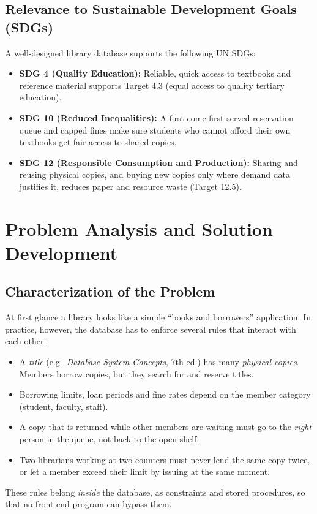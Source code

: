 \documentclass[11pt,a4paper]{report}
\begin{document}
\subsection{Relevance to Sustainable Development Goals (SDGs)}
A well-designed library database supports the following UN SDGs:
\begin{itemize}
    \item \textbf{SDG 4 (Quality Education):} Reliable, quick access to textbooks and reference material supports Target 4.3 (equal access to quality tertiary education).
    \item \textbf{SDG 10 (Reduced Inequalities):} A first-come-first-served reservation queue and capped fines make sure students who cannot afford their own textbooks get fair access to shared copies.
    \item \textbf{SDG 12 (Responsible Consumption and Production):} Sharing and reusing physical copies, and buying new copies only where demand data justifies it, reduces paper and resource waste (Target 12.5).
\end{itemize}


\section{Problem Analysis and Solution Development}

\subsection{Characterization of the Problem}
At first glance a library looks like a simple ``books and borrowers'' application. In practice, however, the database has to enforce several rules that interact with each other:
\begin{itemize}
    \item A \emph{title} (e.g.\ \textit{Database System Concepts}, 7th ed.) has many \emph{physical copies}. Members borrow copies, but they search for and reserve titles.
    \item Borrowing limits, loan periods and fine rates depend on the member category (student, faculty, staff).
    \item A copy that is returned while other members are waiting must go to the \emph{right} person in the queue, not back to the open shelf.
    \item Two librarians working at two counters must never lend the same copy twice, or let a member exceed their limit by issuing at the same moment.
\end{itemize}
These rules belong \emph{inside} the database, as constraints and stored procedures, so that no front-end program can bypass them.
\end{document}
